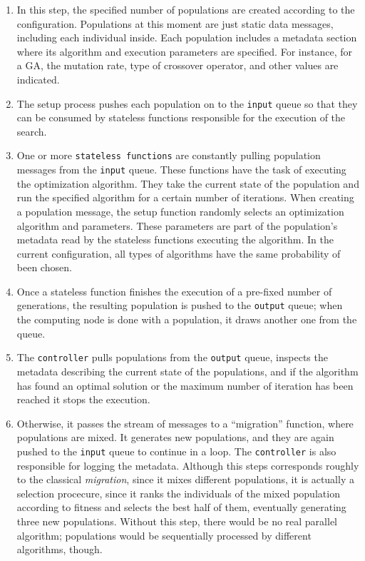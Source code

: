 \documentclass[runningheads]{llncs}
\begin{document}
\begin{enumerate}

\item In this step, the specified number of populations are created according
to the configuration. Populations at this moment are just static data messages,
including each individual inside. Each population includes a metadata section
where its algorithm and execution parameters are specified. For instance, for a
GA, the mutation rate, type of crossover operator, and other values are
indicated.

\item The setup process pushes each population on to the \texttt{input}
queue so that they can be consumed by stateless functions responsible for the
execution of the search.

\item One or more \texttt{stateless functions} are constantly pulling
population messages from the \texttt{input} queue. These functions have the
task of executing the optimization algorithm. They take the current state of
the population and run the specified algorithm for a certain number of
iterations. When creating a population message, the setup function randomly
selects an optimization algorithm and parameters. These parameters
are part of the population's metadata read by the stateless
functions executing the algorithm. In the current configuration, all
types of algorithms have the same probability of been chosen. %

\item Once a stateless function finishes the execution of a pre-fixed number of
  generations, the resulting population is pushed to
the \texttt{output} queue; when the computing node is done with a population, it draws another one from the
queue.

\item The \texttt{controller} pulls populations from the \texttt{output} queue,
inspects the metadata describing the current state of the populations, and if
the algorithm has found an optimal solution or the maximum number of iteration
has been reached it stops the execution.

\item Otherwise, it passes the stream of messages to a ``migration'' function,
  where populations are mixed. It generates new populations, and they are
again pushed to the \texttt{input} queue to continue in a loop. The
\texttt{controller} is also responsible for logging the
metadata. Although this steps corresponds roughly to the classical
{\em migration}, since it mixes different populations, it is actually
a selection procecure, since it ranks the individuals of the mixed
population according to fitness and selects the best half of them,
eventually generating three new populations. Without this step, there
would be no real parallel algorithm; populations would be sequentially
processed by different algorithms, though.

\end{enumerate}
\end{document}
